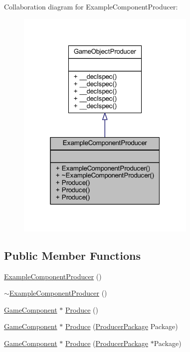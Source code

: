 Collaboration diagram for Example\-Component\-Producer\-:
\nopagebreak
\begin{figure}[H]
\begin{center}
\leavevmode
\includegraphics[width=244pt]{class_example_component_producer__coll__graph}
\end{center}
\end{figure}
\subsection*{Public Member Functions}
\begin{DoxyCompactItemize}
\item 
\hyperlink{class_example_component_producer_ad4eeb56b75cbf68545d82619aa8e0184}{Example\-Component\-Producer} ()
\item 
\hyperlink{class_example_component_producer_a2c090cf13157589dfcd4fd9441d4d4f3}{$\sim$\-Example\-Component\-Producer} ()
\item 
\hyperlink{class_game_component}{Game\-Component} $\ast$ \hyperlink{class_example_component_producer_a63aba60e4b967000da407340505838de}{Produce} ()
\item 
\hyperlink{class_game_component}{Game\-Component} $\ast$ \hyperlink{class_example_component_producer_aeb985b69039c1db83c5826c01f31f53c}{Produce} (\hyperlink{class_producer_package}{Producer\-Package} Package)
\item 
\hyperlink{class_game_component}{Game\-Component} $\ast$ \hyperlink{class_example_component_producer_a177b5d9088f69aed43d10c9b2b8f2c01}{Produce} (\hyperlink{class_producer_package}{Producer\-Package} $\ast$Package)
\end{DoxyCompactItemize}


